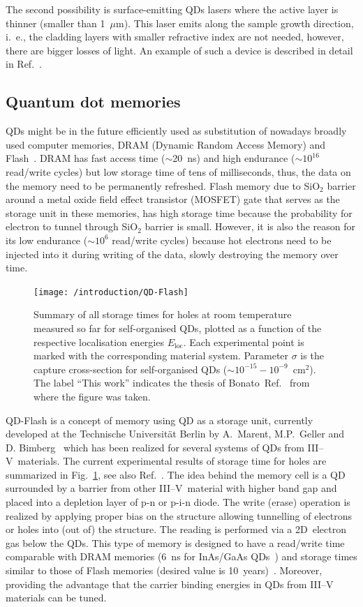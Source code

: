 \documentclass[
a4paper, %
11pt, %
onecolumn, %
openany, %
oldfontcommands,
]{memoir}
\begin{document}
The second possibility is surface-emitting QDs lasers where the active layer is thinner (smaller than 1~$\mu$m). This laser emits along the sample growth direction, i.~e., the cladding layers with smaller refractive index are not needed, however, there are bigger losses of light. An example of such a device is described in detail in Ref.~\cite{Saito}.



\subsection*{Quantum dot memories}
QDs might be in the future efficiently used as substitution of nowadays broadly used computer memories, DRAM (Dynamic Random Access Memory) and Flash~\cite{Pavan,Sherwin}. DRAM has fast access time ($\sim$20~ns) and high endurance ($\sim10^{16}$ read/write cycles) but low storage time of tens of milliseconds, thus, the data on the memory need to be permanently refreshed. Flash memory due to SiO$_2$ barrier around a metal oxide field effect transistor (MOSFET) gate that serves as the storage unit in these memories, has high storage time because the probability for electron to tunnel through SiO$_2$ barrier is small. However, it is also the reason for its low endurance ($\sim 10^{6}$ read/write cycles) because hot electrons need to be injected into it during writing of the data, slowly destroying the memory over time. 
%
\begin{figure}
	\centering
	\texttt{[image: /introduction/QD-Flash]}
	\caption{Summary of all storage times for holes at room temperature measured so far for self-organised QDs, plotted as a function of the respective localisation energies $E_\mathrm{loc}$. Each experimental point is marked with the corresponding material system. Parameter $\sigma$ is the capture cross-section for self-organised QDs ($\sim10^{ -15} -10^ {-9}$~cm$^2$). The label \enquote{This work} indicates the thesis of Bonato~Ref.~\cite{t_bonato} from where the figure was taken.}
	\label{fig:intr:QD-flash}
\end{figure}

QD-Flash is a concept of memory using QD as a storage unit, currently developed at the Technische Universität Berlin by A.~Marent, M.P.~Geller and D. Bimberg~\cite{Marent_SST2011_QDFlash} which has been realized for several systems of QDs from III--V~materials. The current experimental results of storage time for holes are summarized in Fig.~\ref{fig:intr:QD-flash}, see also Ref.~\cite{t_bonato}. The idea behind the memory cell is a QD surrounded by a barrier from other III--V~material with higher band gap and placed into a depletion layer of p-n or p-i-n diode. The write (erase) operation is realized by applying proper bias on the structure allowing tunnelling of electrons or holes into (out of) the structure. The reading is performed via a 2D~electron gas below the QDs. This type of memory is designed to have a read/write time comparable with DRAM memories (6~ns for InAs/GaAs QDs~\cite{GellerAPL}) and storage times similar to those of Flash memories (desired value is 10~years)~\cite{GellerAPL,GellerJOP}. Moreover, providing the advantage that the carrier binding energies in QDs from III--V materials can be tuned. 
\end{document}
